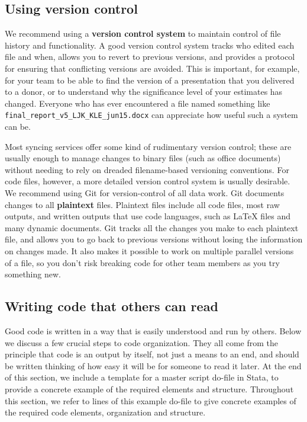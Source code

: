 \documentclass[
]{book}
\begin{document}
\hypertarget{using-version-control}{%
\subsection*{Using version control}\label{using-version-control}}

We recommend using a \textbf{version control system} to
maintain control of file history and functionality.
A good version control system tracks who edited each file and when,
allows you to revert to previous versions,
and provides a protocol for ensuring that conflicting versions are avoided.
This is important, for example, for your team
to be able to find the version of a presentation that you delivered to a donor,
or to understand why the significance level of your estimates has changed.
Everyone who has ever encountered a file named something like \texttt{final\_report\_v5\_LJK\_KLE\_jun15.docx}
can appreciate how useful such a system can be.

Most syncing services offer some kind of rudimentary version control;
these are usually enough to manage changes to binary files (such as office documents)
without needing to rely on dreaded filename-based versioning conventions.
For code files, however, a more detailed version control system is usually desirable.
We recommend using Git for version-control of all data work.
Git documents changes to all \textbf{plaintext} files.
Plaintext files include all code files, most raw outputs,
and written outputs that use code languages,
such as LaTeX files and many dynamic documents.
Git tracks all the changes you make to each plaintext file,
and allows you to go back to previous versions without losing the information on changes made.
It also makes it possible to work on multiple parallel versions of a file,
so you don't risk breaking code for other team members as you try something new.

\hypertarget{writing-code-that-others-can-read}{%
\subsection*{Writing code that others can read}\label{writing-code-that-others-can-read}}

Good code is written in a way that is easily understood and run by others.
Below we discuss a few crucial steps to code organization.
They all come from the principle that code is an output by itself,
not just a means to an end,
and should be written thinking of how easy it will be for someone to read it later.
At the end of this section, we include a template for a master script do-file in Stata,
to provide a concrete example of the required elements and structure.
Throughout this section, we refer to lines of this example do-file
to give concrete examples of the required code elements, organization and structure.
\end{document}
